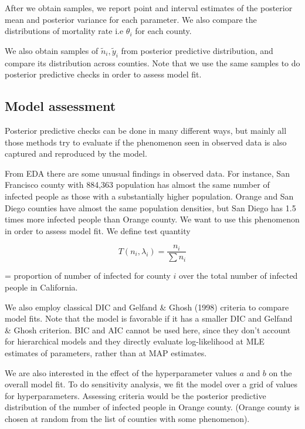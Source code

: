 \documentclass[11pt,twocolumn]{asaproc}
\begin{document}
After we obtain samples, we report point and interval estimates of the posterior mean and posterior variance for each parameter. We also compare the distributions of mortality rate i.e $\theta_i$ for each county. 

We also obtain samples of $\tilde{n}_i, \tilde{y}_i$ from posterior predictive distribution, and compare its distribution across counties. Note that we use the same samples to do posterior predictive checks in order to assess model fit. 






\subsection{Model assessment}
Posterior predictive checks can be done in many different ways, but mainly all those methods try to evaluate if the phenomenon seen in observed data is also captured and reproduced by the model. 

From EDA there are some unusual findings in observed data. For instance, San Francisco county with 884,363 population has almost the same number of infected people as those with a substantially higher population. Orange and San Diego counties have almost the same population densities, but San Diego has 1.5 times more infected people than Orange county. We want to use this phenomenon in order to assess model fit. We define test quantity 

$$T(n_i, \lambda_i) = \frac{n_i}{\sum n_i}$$ 

= proportion of number of infected for county $i$ over the total number of infected people in California.


We also employ classical DIC and Gelfand \& Ghosh (1998) criteria to compare model fits. Note that the model is favorable if it has a smaller DIC and Gelfand \& Ghosh criterion. BIC and AIC cannot be used here, since they don't account for hierarchical models and they directly evaluate log-likelihood at MLE estimates of parameters, rather than at MAP estimates.


We are also interested in the effect of the hyperparameter values $a$ and $b$ on the overall model fit. To do sensitivity analysis, we fit the model over a grid of values for hyperparameters. Assessing criteria would be the posterior predictive distribution of the number of infected people in Orange county. (Orange county is chosen at random from the list of counties with some phenomenon).
\end{document}
